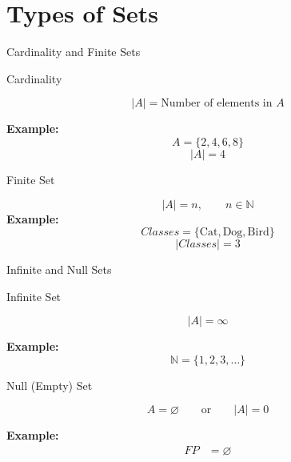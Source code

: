 \section{Types of Sets}

\begin{frame}{Cardinality and Finite Sets}

\begin{block}{Cardinality}

\[
|A|=\text{Number of elements in }A
\]

\textbf{Example:}
\[
A=\{2,4,6,8\}
\]
\[
|A|=4
\]

\end{block}

\vspace{0.1cm}

\begin{block}{Finite Set}

\[
|A|=n,\qquad n\in\mathbb N
\]
\textbf{Example:}
\[
Classes = \{\text{Cat},\text{Dog},\text{Bird}\} \]
\[|Classes| = 3
\]

\end{block}

\end{frame}

\begin{frame}{Infinite and Null Sets}

\begin{block}{Infinite Set}

\[
|A|=\infty
\]

\textbf{Example:}
\[
\mathbb N=\{1,2,3,\ldots\}
\]

\end{block}

\vspace{0.1cm}

\begin{block}{Null (Empty) Set}

\[
A=\varnothing
\qquad\text{or}\qquad
|A|=0
\]

\textbf{Example:}
\[
\begin{aligned}
FP &= \varnothing
\end{aligned}
\]

\end{block}

\end{frame}

